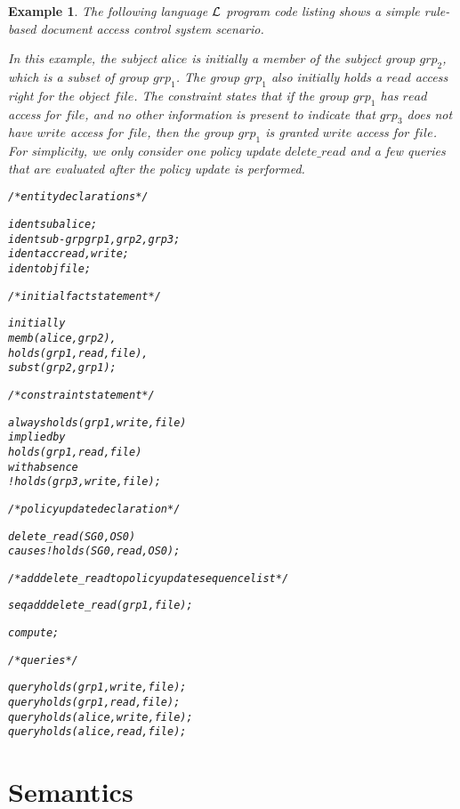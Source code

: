\documentclass[11pt]{report}
\newtheorem{vexample}{Example}[chapter]
\newenvironment{vverbatim}
{
  \begin{alltt}
}
{
    \vspace{-\baselineskip}
  \end{alltt}
}
\begin{document}
      \begin{vexample}
        \label{exam-langl-syntx}
        The following language ${\cal L}$ program code listing shows a
        simple rule-based document access control system scenario.

        In this example, the subject $alice$ is initially a member of the
        subject group $grp_2$, which is a subset of group $grp_1$. The
        group $grp_1$ also initially holds a $read$ access right for the
        object $file$. The constraint states that if the group $grp_1$ has
        $read$ access for $file$, and no other information is present to
        indicate that $grp_3$ does not have $write$ access for $file$, then
        the group $grp_1$ is granted $write$ access for $file$. For
        simplicity, we only consider one policy update $delete\_read$ and a
        few queries that are evaluated after the policy update is
        performed.

        \begin{vverbatim}
  /* entity declarations */

  ident sub alice;
  ident sub-grp grp1, grp2, grp3;
  ident acc read, write;
  ident obj file;

  /* initial fact statement */

  initially
    memb(alice, grp2),
    holds(grp1, read, file),
    subst(grp2, grp1);

  /* constraint statement */

  always holds(grp1, write, file)
    implied by
      holds(grp1, read, file)
    with absence
      !holds(grp3, write, file);

  /* policy update declaration */

  delete\_read(SG0, OS0)
    causes !holds(SG0, read, OS0);

  /* add delete\_read to policy update sequence list */

  seq add delete\_read(grp1, file);

  compute;

  /* queries */

  query holds(grp1, write, file);
  query holds(grp1, read, file);
  query holds(alice, write, file);
  query holds(alice, read, file);
        \end{vverbatim}
      \end{vexample}

    \section{Semantics}
      \label{sect-langl-seman}
\end{document}

